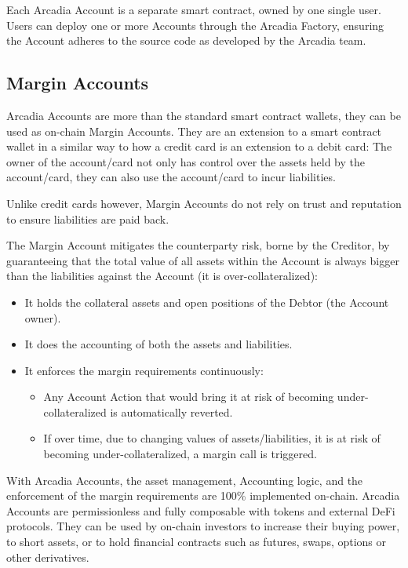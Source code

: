 \documentclass[sigconf,nonacm]{acmart}
\begin{document}
Each Arcadia Account is a separate smart contract, owned by one single user.
Users can deploy one or more Accounts through the Arcadia Factory, ensuring the Account adheres to the source code as developed by the Arcadia team.

\subsection{Margin Accounts}
\label{subsec:margin-accounts}
Arcadia Accounts are more than the standard smart contract wallets, they can be used as on-chain Margin Accounts.
They are an extension to a smart contract wallet in a similar way to how a credit card is an extension to a debit card:
The owner of the account/card not only has control over the assets held by the account/card,
they can also use the account/card to incur liabilities.

Unlike credit cards however, Margin Accounts do not rely on trust and reputation to ensure liabilities are paid back.

The Margin Account mitigates the counterparty risk, borne by the Creditor,
by guaranteeing that the total value of all assets within the Account is always bigger than the liabilities against the Account (it is over-collateralized):
\begin{itemize}
    \item It holds the collateral assets and open positions of the Debtor (the Account owner).
    \item It does the accounting of both the assets and liabilities.
    \item It enforces the margin requirements continuously:
    \begin{itemize}
        \item Any Account Action that would bring it at risk of becoming under-collateralized is automatically reverted.
        \item If over time, due to changing values of assets/liabilities, it is at risk of becoming under-collateralized, a margin call is triggered.
    \end{itemize}
\end{itemize}

With Arcadia Accounts, the asset management, Accounting logic, and the enforcement of the margin requirements are 100\% implemented on-chain.
Arcadia Accounts are permissionless and fully composable with tokens and external DeFi protocols.
They can be used by on-chain investors to increase their buying power, to short assets, or to hold financial contracts such as futures, swaps, options or other derivatives.
\end{document}
